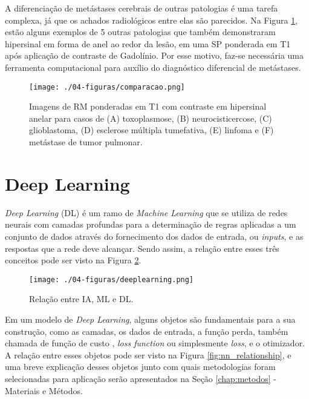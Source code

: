 A diferenciação de metástases cerebrais de outras patologias é uma tarefa complexa, já que os achados radiológicos entre elas são parecidos. Na Figura \ref{fig:comparacao}, estão alguns exemplos de 5 outras patologias que também demonstraram hipersinal em forma de anel ao redor da lesão, em uma SP ponderada em T1 após aplicação de contraste de Gadolínio. Por esse motivo, faz-se necessária uma ferramenta computacional para auxílio do diagnóstico diferencial de metástases.

\begin{figure}[!htb]
\centering
    \texttt{[image: ./04-figuras/comparacao.png]}
	\caption{Imagens de RM ponderadas em T1 com contraste em hipersinal anelar para casos de (A) toxoplasmose, (B) neurocisticercose, (C) glioblastoma, (D) esclerose múltipla tumefativa, (E) linfoma e (F) metástase de tumor pulmonar.}\vspace{-0.2cm}
    \label{fig:comparacao}
\end{figure}

\section{Deep Learning}

\textit{Deep Learning} (DL) é um ramo de \textit{Machine Learning} que se utiliza de redes neurais com camadas profundas para a determinação de regras aplicadas a um conjunto de dados através do fornecimento dos dados de entrada, ou \textit{inputs}, e as respostas que a rede deve alcançar. Sendo assim, a relação entre esses três conceitos pode ser visto na Figura \ref{fig:deeplearning}.

\begin{figure}[!htb]
\centering
    \texttt{[image: ./04-figuras/deeplearning.png]}
	\caption{Relação entre IA, ML e DL.}\vspace{-0.2cm}
    \label{fig:deeplearning}
\end{figure}

Em um modelo de \textit{Deep Learning}, alguns objetos são fundamentais para a sua construção, como as camadas, os dados de entrada, a função perda, também chamada de função de custo , \textit{loss function} ou simplesmente \textit{loss}, e o otimizador. A relação entre esses objetos pode ser visto na Figura \ref{fig:nn_relationship}, e uma breve explicação desses objetos junto com quais metodologias foram selecionadas para aplicação serão apresentados na Seção \ref{chap:metodos} - Materiais e Métodos.

